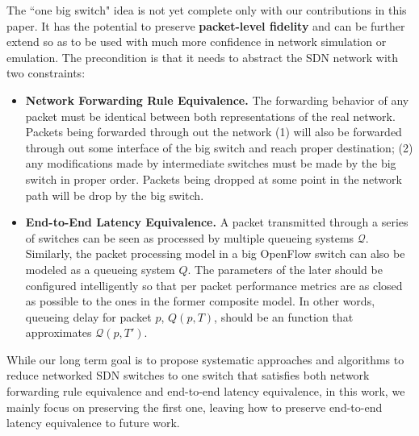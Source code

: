 The ``one big switch" idea is not yet complete only with our contributions in this paper.
It has the potential to preserve \textbf{packet-level fidelity} and
can be further extend so as to be used with much more confidence in network
simulation or emulation.
The precondition is that it needs to abstract the SDN network with two constraints:
\begin{itemize}
\item \textbf{Network Forwarding Rule Equivalence.}
        The forwarding behavior of any packet must be identical
        between both representations of the real network. Packets being
        forwarded through out the network (1) will also be forwarded through out
        some interface of the big switch and reach proper destination;
        (2) any modifications made by intermediate switches must be made by the
        big switch in proper order.
        Packets being dropped at some point in the network path will be drop by the
        big switch.
\item \textbf{End-to-End Latency Equivalence.}
        A packet transmitted through a series of
        switches can be seen as processed by multiple queueing systems $\mathcal{Q}$.
        Similarly, the packet processing model in a big OpenFlow switch can
        also be modeled as a queueing system $Q$.
        The parameters of the later should be configured intelligently
        so that per packet performance metrics are as closed as possible to the ones
        in the former composite model.
        In other words, queueing delay for packet $p$, $Q(p, T)$, should be an
        function that approximates $\mathcal{Q}(p, T')$.
\end{itemize}

While our long term goal is to propose systematic approaches and algorithms to reduce
networked SDN switches to one switch that satisfies both network forwarding rule equivalence
and end-to-end latency equivalence, in this work, we mainly focus on preserving the first one,
leaving how to preserve end-to-end latency equivalence to future work.

